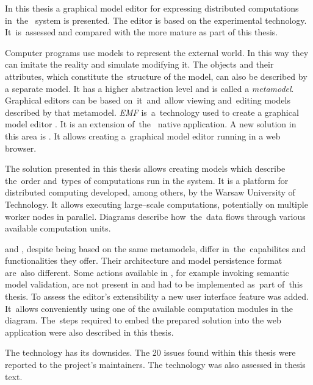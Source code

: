{
In this thesis a graphical model editor for expressing distributed
computations in~the~\BalticLSC{} system is presented. The editor is based on
the experimental \SiriusWeb{} technology. It~is~assessed and
compared with the more mature \SiriusDesktop{} as part of this thesis.

Computer programs use models to represent the external world. In this way they
can imitate the reality and simulate modifying it. The objects and their
attributes, which constitute the~structure of the model, can also be described
by a separate model. It has a higher abstraction level and is called a
\emph{metamodel}.
Graphical editors can be based on~it~and~allow viewing and~editing models
described by that metamodel. \emph{\acrlong{EMF}} is~a~technology used to
create a graphical model editor \SiriusDesktop{}. It is an extension
of~the~\Eclipse{} native application. A new solution in this area is
\SiriusWeb{}. It
allows creating a~graphical model editor running in a web browser.

The solution presented in this thesis allows creating models which describe
the~order and~types of computations run in the \BalticLSC{} system. It is a
platform for distributed computing developed, among others, by the Warsaw
University of
Technology. It allows executing large--scale %
computations, potentially on multiple worker nodes in parallel.
Diagrams describe how~the~data flows through various available computation
units.

\SiriusDesktop{} and \SiriusWeb{}, despite being based on the same metamodels,
differ in~the~capabilites and functionalities they offer. Their architecture
and model persistence format are~also different. Some actions available in
\SiriusDesktop{}, for example invoking semantic model validation, are not
present in \SiriusWeb{} and had to be implemented as~part of~this thesis.
To assess the editor's extensibility a new user interface feature was added.
It~allows conveniently using one of the available computation modules in the
diagram. The~steps required to embed the prepared solution into the
\BalticLSC{} web application were also described in this thesis.

The \SiriusWeb{} technology has its downsides. The 20 issues found within this
thesis were reported to the project's maintainers. The technology was also
assessed in thesis text.
}
